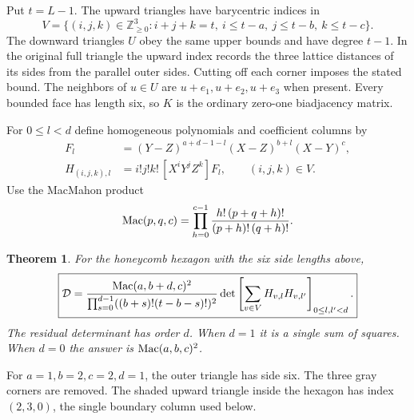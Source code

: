 \documentclass[11pt,letterpaper]{article}
\newtheorem{theorem}{Theorem}[section]
\newcommand{\N}{\mathbb Z_{\ge0}}
\newcommand{\Gram}{\mathcal D}
\newcommand{\Mac}{\mathop{\rm Mac}}
\newcommand{\coeff}[1]{[#1]}
\begin{document}
Put \(t=L-1\). The upward triangles have barycentric indices in
\[
 V=\{(i,j,k)\in\N^3:i+j+k=t,\ i\le t-a,\ j\le t-b,\ k\le t-c\}.
\]
The downward triangles \(U\) obey the same upper bounds and have degree \(t-1\). In the original full triangle the upward index records the three lattice distances of its sides from the parallel outer sides. Cutting off each corner imposes the stated bound. The neighbors of \(u\in U\) are \(u+e_1,u+e_2,u+e_3\) when present. Every bounded face has length six, so \(K\) is the ordinary zero-one biadjacency matrix.

For \(0\le l<d\) define homogeneous polynomials and coefficient columns by
\begin{align}
 F_l&=(Y-Z)^{a+d-1-l}(X-Z)^{b+l}(X-Y)^c,\label{eq:poly}\\
 H_{(i,j,k),l}&=i!j!k!\,\coeff{X^iY^jZ^k}F_l,\qquad (i,j,k)\in V.\label{eq:coeff}
\end{align}
Use the MacMahon product
\[
 \Mac(p,q,c)=\prod_{h=0}^{c-1}\frac{h!\,(p+q+h)!}{(p+h)!\,(q+h)!}.
\]
\begin{theorem}\label{th:hex}
For the honeycomb hexagon with the six side lengths above,
\[
 \boxed{\displaystyle
 \Gram=\frac{\Mac(a,b+d,c)^2}{\prod_{s=0}^{d-1}((b+s)!(t-b-s)!)^2}
 \det\left[\sum_{v\in V}H_{v,l}H_{v,l'}\right]_{0\le l,l'<d}.}
\]
The residual determinant has order \(d\). When \(d=1\) it is a single sum of squares. When \(d=0\) the answer is \(\Mac(a,b,c)^2\).
\end{theorem}

\begin{center}
\begin{minipage}{.26\linewidth}\centering
{}
\end{minipage}\hspace{.02\linewidth}
\begin{minipage}{.57\linewidth}\small
For \(a=1,b=2,c=2,d=1\), the outer triangle has side six. The three gray corners are removed. The shaded upward triangle inside the hexagon has index \((2,3,0)\), the single boundary column used below.
\end{minipage}
\end{center}
\end{document}

